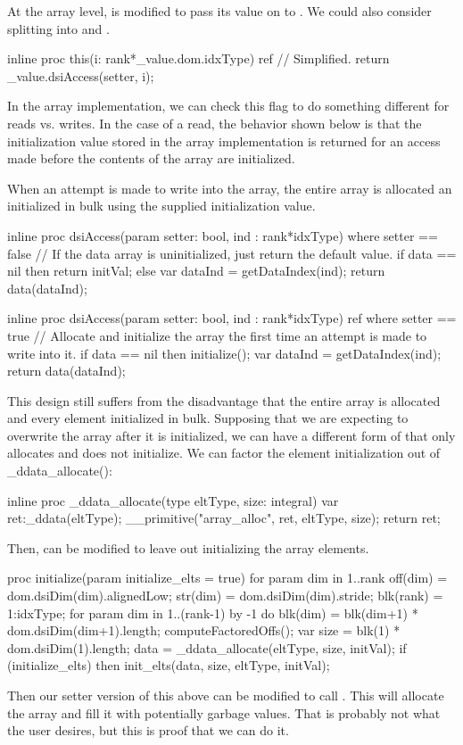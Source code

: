 At the array level,  is modified to pass its value on to .
We could also consider splitting  into  and .
\begin{chapel}
    inline proc this(i: rank*_value.dom.idxType) ref {
      // Simplified.
      return _value.dsiAccess(setter, i);
    }
\end{chapel}
\noindent
In the array implementation, we can check this flag to do something different for reads
vs. writes.  In the case of a read, the behavior shown below is that the initialization
value stored in the array implementation is returned for an access made before the
contents of the array are initialized.

When an attempt is made to write into the array, the entire array is allocated an
initialized in bulk using the supplied initialization value.
\begin{chapel}
    inline proc dsiAccess(param setter: bool, ind : rank*idxType) 
    where setter == false
    {
      // If the data array is uninitialized, just return the default value.
      if data == nil then
        return initVal;
      else {
        var dataInd = getDataIndex(ind);
        return data(dataInd);
      }
    }

    inline proc dsiAccess(param setter: bool, ind : rank*idxType) ref
    where setter == true
    {
      // Allocate and initialize the array the first time an attempt is made to write into it.
      if data == nil then
        initialize();
      var dataInd = getDataIndex(ind);
      return data(dataInd);
    }
\end{chapel}

This design still suffers from the disadvantage that the entire array is allocated and
every element initialized in bulk.  Supposing that we are expecting to overwrite the array
after it is initialized, we can have a different form of  that only
allocates and does not initialize.  We can factor the element initialization out of
_ddata_allocate():
\begin{chapel}
  inline proc _ddata_allocate(type eltType, size: integral) {
    var ret:_ddata(eltType);
    __primitive("array_alloc", ret, eltType, size);
    return ret;
  }
\end{chapel}
Then,  can be modified to leave out initializing the array elements.
\begin{chapel}
    proc initialize(param initialize_elts = true) {
      for param dim in 1..rank {
        off(dim) = dom.dsiDim(dim).alignedLow;
        str(dim) = dom.dsiDim(dim).stride;
      }
      blk(rank) = 1:idxType;
      for param dim in 1..(rank-1) by -1 do
        blk(dim) = blk(dim+1) * dom.dsiDim(dim+1).length;
      computeFactoredOffs();
      var size = blk(1) * dom.dsiDim(1).length;
      data = _ddata_allocate(eltType, size, initVal);
      if (initialize_elts) then
        init_elts(data, size, eltType, initVal);
    }
\end{chapel}
Then our setter version of this above can be modified to call .
This will allocate the array and fill it with potentially garbage values.  That is
probably not what the user desires, but this is proof that we can do it.

